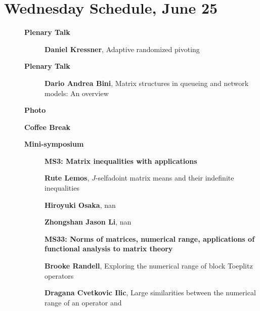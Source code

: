 \documentclass[ILAS2025-program.tex]{subfiles}
\begin{document}
\section{Wednesday Schedule, June 25}
    
    \begin{description}
    \item[] \textbf{Plenary Talk} 
    \begin{description}
        \item[] \textbf{Daniel Kressner}, Adaptive randomized pivoting
        \end{description}
        \item[] \textbf{Plenary Talk} 
    \begin{description}
        \item[] \textbf{Dario Andrea Bini}, Matrix structures in queueing and network models: An overview
        \end{description}
        \item[] \textbf{Photo} 
    \item[] \textbf{Coffee Break} 
    \item[] \textbf{Mini-symposium} 
    \begin{description}
    \item[] {\color{mstitle}\textbf{MS3: Matrix inequalities with applications}} 
    \item[] \textbf{Rute Lemos}, $J$-selfadoint matrix means and their indefinite inequalities
        \item[] \textbf{Hiroyuki Osaka}, nan
        \item[] \textbf{Zhongshan Jason Li}, nan
        \end{description}
    \begin{description}
    \item[] {\color{mstitle}\textbf{MS33: Norms of matrices, numerical range, applications of functional analysis to matrix theory}} 
    \item[] \textbf{Brooke Randell}, Exploring the numerical range of block Toeplitz operators
        \item[] \textbf{Dragana Cvetkovic Ilic}, Large similarities between the numerical range of an operator and

\end{description}
\end{description}
\end{document}

